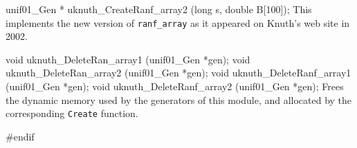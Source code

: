 unif01_Gen * uknuth_CreateRanf_array2 (long s, double B[100]);
\endcode
  \tab  This implements  the new version of {\tt ranf\_array} as it
   appeared on Knuth's web site in 2002.
  \endtab


\code

void uknuth_DeleteRan_array1  (unif01_Gen *gen);
void uknuth_DeleteRan_array2  (unif01_Gen *gen);
void uknuth_DeleteRanf_array1 (unif01_Gen *gen);
void uknuth_DeleteRanf_array2 (unif01_Gen *gen);
\endcode
 \tab Frees the dynamic memory used by the generators of this module,
  and allocated by the corresponding {\tt Create} function.
 \endtab
\code

\hide
#endif
\endhide
\endcode
